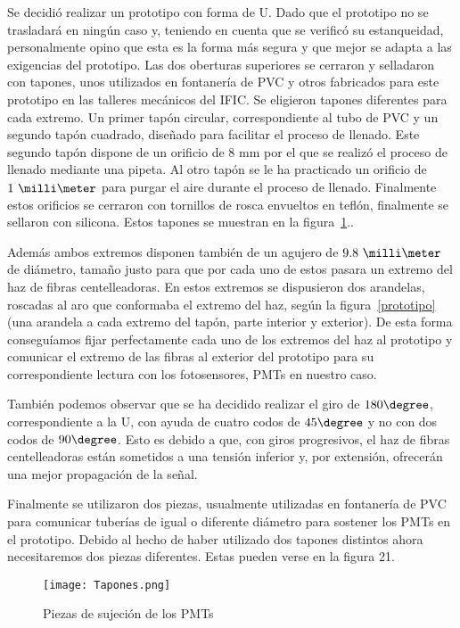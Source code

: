 Se decidió realizar un prototipo con forma de U. Dado que el prototipo no se trasladará en ningún caso y, teniendo en cuenta que se verificó su estanqueidad, personalmente opino que esta es la forma más segura y que mejor se adapta a las exigencias del prototipo. Las dos oberturas superiores se cerraron  y selladaron con tapones, unos utilizados en fontanería de PVC y otros fabricados para este prototipo en las talleres mecánicos del IFIC. Se eligieron tapones diferentes para cada extremo. Un primer tapón circular,  correspondiente al tubo de PVC y un segundo tapón cuadrado, diseñado para facilitar el proceso de llenado. Este segundo tapón dispone de  un orificio de 8 mm por el que se realizó el proceso de llenado  mediante una pipeta. Al otro tapón  se le ha practicado  un orificio de $1~\milli\meter$ para purgar el aire durante el  proceso de llenado. Finalmente estos orificios se cerraron con  tornillos de rosca envueltos en teflón, finalmente se sellaron con silicona. Estos tapones se muestran en la figura~\ref{tapones}..

Además ambos extremos disponen también de un agujero de $9.8~\milli\meter$ de diámetro, tamaño justo para que por cada uno de estos pasara un extremo del haz de fibras centelleadoras. En estos extremos se dispusieron dos arandelas, roscadas al aro que conformaba el extremo del haz, según la figura~\ref{prototipo} (una arandela a cada extremo del tapón, parte interior y exterior). De esta forma conseguíamos fijar perfectamente cada uno de los extremos del haz al prototipo y comunicar el extremo de las fibras al exterior del prototipo para su correspondiente lectura con los fotosensores, PMTs en nuestro caso. 



También podemos observar que se ha decidido realizar el giro de $180\degree$, correspondiente a la U, con ayuda de cuatro codos de $45\degree$ y no con dos codos de $90\degree$. Esto es debido a que, con giros progresivos, el haz de fibras centelleadoras están sometidos a una tensión inferior y, por extensión, ofrecerán una mejor propagación de la señal.

Finalmente se utilizaron dos piezas, usualmente utilizadas en fontanería de PVC para comunicar tuberías de igual o diferente diámetro para sostener los PMTs en el prototipo. Debido al hecho de haber utilizado dos tapones distintos ahora necesitaremos dos piezas diferentes. Estas pueden verse en la figura 21.

\begin{figure}[hbtp]
\centering
\texttt{[image: Tapones.png]}\\
\caption{ Piezas de sujeción de los PMTs\label{tapones}
}
\end{figure}

